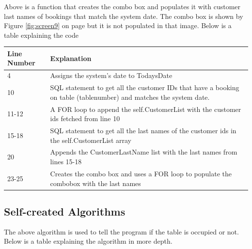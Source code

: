 Above is a function that creates the combo box and populates it with customer last names of bookings that match the system date. The combo box is shown by Figure \ref{fig:screen9} on page \pageref{fig:screen9} but it is not populated in that image. Below is a table explaining the code

\begin{center}
\begin{tabular}{|p{5cm}|p{7.5cm}|}
\hline
\textbf{Line Number} & \textbf{Explanation} \\ \hline
4 & Assigns the system's date to TodaysDate \\ \hline
10 & SQL statement to get all the customer IDs that have a booking on table (tablenumber) and matches the system date.  \\ \hline
11-12 & A FOR loop to append the self.CustomerList with the customer ids fetched from line 10 \\ \hline
15-18 & SQL statement to get all the last names of the customer ids in the self.CustomerList array \\ \hline
20 & Appends the CustomerLastName list with the last names from lines 15-18 \\ \hline
23-25 & Creates the combo box and uses a FOR loop to populate the combobox with the last names \\ \hline


\end{tabular}
\end{center}

\newpage
\subsection{Self-created Algorithms}
The above algorithm is used to tell the program if the table is occupied or not. Below is a table explaining the algorithm in more depth.

